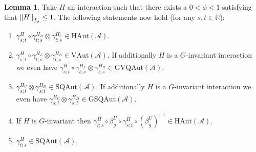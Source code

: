 \documentclass[12pt,a4paper,twoside]{article}
\renewcommand{\AA}{\mathcal A}
\newcommand{\RR}{\mathbb R}
\theoremstyle{definition}
\newtheorem{lemma}[theorem]{Lemma}
\numberwithin{equation}{section}
\begin{document}
\begin{lemma}\label{lem:PropertiesLocallyGeneratedAutomorphisms}
	Take $H$ an interaction such that there exists a $0<\phi<1$ satisfying that $\norm{H}_{f_\phi}\leq 1$. The following statements now hold (for any $s,t\in\RR$):
	\begin{enumerate}
		\item $\gamma^H_{s;t}\circ\gamma^{H_D}_{t;s}\otimes\gamma^{H_U}_{t;s}\in\textrm{HAut}(\AA)$.
		\item $\gamma^H_{s;t}\circ\gamma^{H_L}_{t;s}\otimes\gamma^{H_R}_{t;s}\in\textrm{VAut}(\AA)$. If additionally $H$ is a $G$-invariant interaction we even have $\gamma^H_{s;t}\circ\gamma^{H_L}_{t;s}\otimes\gamma^{H_R}_{t;s}\in\textrm{GVQAut}(\AA)$.
		\item $\gamma^{H_U}_{s;t}\otimes\gamma^{H_D}_{s;t}\in\textrm{SQAut}(\AA)$. If additionally $H$ is a $G$-invariant interaction we even have $\gamma^{H_U}_{s;t}\otimes\gamma^{H_D}_{s;t}\in\textrm{GSQAut}(\AA)$.
		\item If $H$ is $G$-invariant then $\gamma^{H}_{t;s}\circ\beta_g^U\circ\gamma^{H}_{s;t}\circ(\beta_g^U)^{-1}\in\textrm{HAut}(\AA)$.
		\item $\gamma^{H}_{t;s}\in\textrm{SQAut}(\AA)$.
	\end{enumerate}
\end{lemma}
\end{document}
